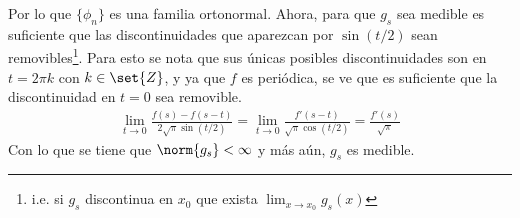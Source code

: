 \documentclass{homework}
\begin{document}
\begin{sol}[1.c]
    Por lo que \(\{\phi_n\}\) es una familia ortonormal. Ahora, para que \(g_s\) sea medible es suficiente que las discontinuidades que aparezcan por \(\sin(t/2)\) sean removibles\footnote{i.e. si \(g_s\) discontinua en \(x_0\) que exista \(\lim_{x\rightarrow x_0}g_s(x)\)}. Para esto se nota que sus únicas posibles discontinuidades son en \(t=2\pi k\) con \(k\in\set{Z}\), y ya que \(f\) es periódica, se ve que es suficiente que la discontinuidad en \(t=0\) sea removible.
    \begin{align*}
        \lim_{t\rightarrow 0}\frac{f(s)-f(s-t)}{2\sqrt{\pi}\sin(t/2)}=\lim_{t\rightarrow 0}\frac{f'(s-t)}{\sqrt{\pi}\cos(t/2)}=\frac{f'(s)}{\sqrt{\pi}}
    \end{align*}
    Con lo que se tiene que \(\norm{g_s}<\infty\) y más aún, \(g_s\) es medible.
\end{sol}
\end{document}
